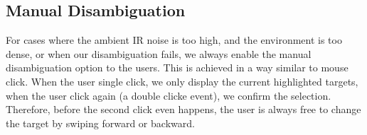 \subsection{Manual Disambiguation}
\label{sec:manu-disamb}

For cases where the ambient IR noise is too high, and the environment is too dense, or when our disambiguation fails, we always enable the manual disambiguation option to the users. This is achieved in a way similar to mouse click. When the user single click, we only display the current highlighted targets, when the user click again (a double clicke event), we confirm the selection. Therefore, before the second click even happens, the user is always free to change the target by swiping forward or backward.


